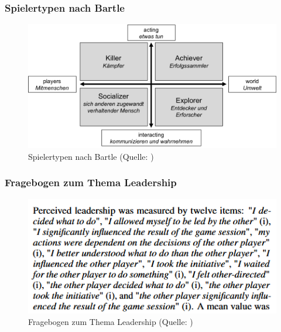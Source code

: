 \documentclass[
	12pt,
	a4paper,
	bibtotoc,
	cleardoubleempty, 
	idxtotoc,
	ngerman,
	openright
	final,
	listof=nochaptergap,
	]{scrbook}
\begin{document}
\begin{appendices}
\subsubsection{Spielertypen nach Bartle}\label{sec:append_study_bartle}


\begin{figure}[ht]
\centering
\includegraphics[width=1\linewidth]{content/attachments/questtionaires/bartle-spielertypenbrell-1024x512.png}
\caption{Spielertypen nach Bartle (Quelle: \citealp{bartle_hearts_1996})}
\label{fig:append_bartle}
\end{figure}

\clearpage

\subsubsection{Fragebogen zum Thema Leadership}\label{sec:append_study_leader}

\begin{figure}[ht]
\centering
\includegraphics[width=1\linewidth]{content/attachments/questtionaires/Leadership.PNG}
\caption{Fragebogen zum Thema Leadership (Quelle: \citealp[S. 5]{emmerich_game_2016})}
\label{fig:append_leadership}
\end{figure}


\end{appendices}
\end{document}
